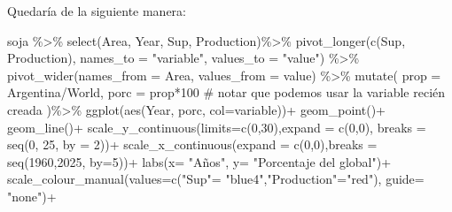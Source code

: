 \documentclass[
  letterpaper,
  DIV=11,
  numbers=noendperiod]{scrartcl}
\newenvironment{Shaded}{\begin{snugshade}}{\end{snugshade}}
\newcommand{\AttributeTok}[1]{\textcolor[rgb]{0.40,0.45,0.13}{#1}}
\newcommand{\CommentTok}[1]{\textcolor[rgb]{0.37,0.37,0.37}{#1}}
\newcommand{\DecValTok}[1]{\textcolor[rgb]{0.68,0.00,0.00}{#1}}
\newcommand{\FunctionTok}[1]{\textcolor[rgb]{0.28,0.35,0.67}{#1}}
\newcommand{\NormalTok}[1]{\textcolor[rgb]{0.00,0.23,0.31}{#1}}
\newcommand{\OtherTok}[1]{\textcolor[rgb]{0.00,0.23,0.31}{#1}}
\newcommand{\SpecialCharTok}[1]{\textcolor[rgb]{0.37,0.37,0.37}{#1}}
\newcommand{\StringTok}[1]{\textcolor[rgb]{0.13,0.47,0.30}{#1}}
\begin{document}
Quedaría de la siguiente manera:

\begin{Shaded}
\begin{Highlighting}[]
\NormalTok{soja }\SpecialCharTok{\%\textgreater{}\%}
  \FunctionTok{select}\NormalTok{(Area, Year, Sup, Production)}\SpecialCharTok{\%\textgreater{}\%}
  \FunctionTok{pivot\_longer}\NormalTok{(}\FunctionTok{c}\NormalTok{(}\StringTok{\textasciigrave{}}\AttributeTok{Sup}\StringTok{\textasciigrave{}}\NormalTok{, }\StringTok{\textasciigrave{}}\AttributeTok{Production}\StringTok{\textasciigrave{}}\NormalTok{), }\AttributeTok{names\_to =} \StringTok{"variable"}\NormalTok{, }\AttributeTok{values\_to =} \StringTok{"value"}\NormalTok{) }\SpecialCharTok{\%\textgreater{}\%}
  \FunctionTok{pivot\_wider}\NormalTok{(}\AttributeTok{names\_from =}\NormalTok{ Area, }\AttributeTok{values\_from =}\NormalTok{ value) }\SpecialCharTok{\%\textgreater{}\%}
  \FunctionTok{mutate}\NormalTok{(}
    \AttributeTok{prop =}\NormalTok{ Argentina}\SpecialCharTok{/}\NormalTok{World,}
    \AttributeTok{porc =}\NormalTok{ prop}\SpecialCharTok{*}\DecValTok{100}  \CommentTok{\# notar que podemos usar la variable recién creada}
\NormalTok{  )}\SpecialCharTok{\%\textgreater{}\%}
  \FunctionTok{ggplot}\NormalTok{(}\FunctionTok{aes}\NormalTok{(Year, porc, }\AttributeTok{col=}\NormalTok{variable))}\SpecialCharTok{+}
  \FunctionTok{geom\_point}\NormalTok{()}\SpecialCharTok{+}
  \FunctionTok{geom\_line}\NormalTok{()}\SpecialCharTok{+}
  \FunctionTok{scale\_y\_continuous}\NormalTok{(}\AttributeTok{limits=}\FunctionTok{c}\NormalTok{(}\DecValTok{0}\NormalTok{,}\DecValTok{30}\NormalTok{),}\AttributeTok{expand =} \FunctionTok{c}\NormalTok{(}\DecValTok{0}\NormalTok{,}\DecValTok{0}\NormalTok{), }\AttributeTok{breaks =} \FunctionTok{seq}\NormalTok{(}\DecValTok{0}\NormalTok{, }\DecValTok{25}\NormalTok{, }\AttributeTok{by =} \DecValTok{2}\NormalTok{))}\SpecialCharTok{+}
  \FunctionTok{scale\_x\_continuous}\NormalTok{(}\AttributeTok{expand =} \FunctionTok{c}\NormalTok{(}\DecValTok{0}\NormalTok{,}\DecValTok{0}\NormalTok{),}\AttributeTok{breaks =} \FunctionTok{seq}\NormalTok{(}\DecValTok{1960}\NormalTok{,}\DecValTok{2025}\NormalTok{, }\AttributeTok{by=}\DecValTok{5}\NormalTok{))}\SpecialCharTok{+}
  \FunctionTok{labs}\NormalTok{(}\AttributeTok{x=} \StringTok{"Años"}\NormalTok{,}
       \AttributeTok{y=} \StringTok{"Porcentaje del global"}\NormalTok{)}\SpecialCharTok{+}
  \FunctionTok{scale\_colour\_manual}\NormalTok{(}\AttributeTok{values=}\FunctionTok{c}\NormalTok{(}\StringTok{"Sup"}\OtherTok{=} \StringTok{"blue4"}\NormalTok{,}\StringTok{"Production"}\OtherTok{=}\StringTok{"red"}\NormalTok{), }\AttributeTok{guide=} \StringTok{"none"}\NormalTok{)}\SpecialCharTok{+}

\end{Highlighting}
\end{Shaded}
\end{document}
